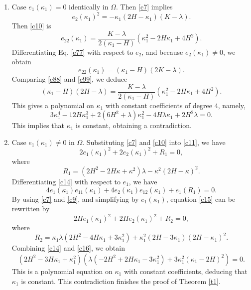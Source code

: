 \documentclass[a4paper,12pt]{amsart}
\theoremstyle{definition}
\begin{document}
\begin{enumerate} 
\item Case  $e_1(\kappa_1)=0$ identically in $\Omega$. Then \eqref{c7}  implies
\begin{equation}\label{e77}
e_2(\kappa_1)^2=- \kappa_1(2H-\kappa_1)(K-\lambda).
\end{equation}
Then \eqref{c10} is 
\begin{equation}\label{e88}
e_{22}(\kappa_1)=\frac{K-\lambda}{2(\kappa_1-H)}( \kappa_1^2-2H\kappa_1+4H^2).
\end{equation}
Differentiating Eq. \eqref{e77} with respect to $e_2$,  and because $e_2(\kappa_1)\not=0$, we obtain 
\begin{equation}\label{e99}
e_{22}(\kappa_1)=(\kappa_1-H)(2K-\lambda). 
\end{equation}
Comparing \eqref{e88} and \eqref{e99}, we deduce
$$(\kappa_1-H)(2H-\lambda)=\frac{K-\lambda}{2(\kappa_1-H)}(\kappa_1^2-2H\kappa_1+4H^2).$$
This gives a polynomial on $\kappa_1$ with constant coefficients of degree $4$, namely, 
$$3\kappa_1^4-12H \kappa_1^3+2(6H^2+\lambda)\kappa_1^2-4H\lambda \kappa_1+2H^2\lambda=0.$$
 This   implies that $\kappa_1$ is constant, obtaining a contradiction.

\item Case  $e_1(\kappa_1)\not=0$   in $\Omega$. Substituting \eqref{c7} and \eqref{c10} into \eqref{c11}, we have
\begin{equation}\label{c14}
    2e_1(\kappa_1)^2+2e_2(\kappa_1)^2+R_1=0,
\end{equation}
where
$$R_1=(2H^2-2H\kappa+\kappa^2)\lambda-\kappa^2(2H-\kappa)^2.$$
Differentiating \eqref{c14} with respect to $e_1$, we have
\begin{equation}\label{c15}
4e_1(\kappa_1)e_{11}(\kappa_1)+4e_2(\kappa_1)e_{12}(\kappa_1)+e_1(R_1)=0.
\end{equation}
By using \eqref{c7} and \eqref{c9}, and simplifying by $e_1(\kappa_1)$,  equation \eqref{c15} can be rewritten by
\begin{equation}\label{c16}
2H e_1(\kappa_1)^2+2H e_2(\kappa_1)^2+R_2=0,
\end{equation}
where
$$R_2=\kappa_1\lambda  \left(2 H^2-4 H \kappa_1+3 \kappa_1^2\right)+\kappa_1^2 (2 H-3 \kappa_1) (2H-\kappa_1)^2.$$
Combining \eqref{c14}  and \eqref{c16}, we obtain  
$$
\left(2 H^2-3 H \kappa_1+\kappa_1^2\right) \left(\lambda  \left(-2 H^2+2 H \kappa_1-3 \kappa_1^2\right)+3 \kappa_1^2 (\kappa_1-2 H)^2\right)=0.$$ 
This is a polynomial equation on $\kappa_1$ with constant coefficients, deducing that $\kappa_1$ is constant. This       contradiction finishes the proof of  Theorem \ref{t1}.


\end{enumerate}
 
\end{document}
